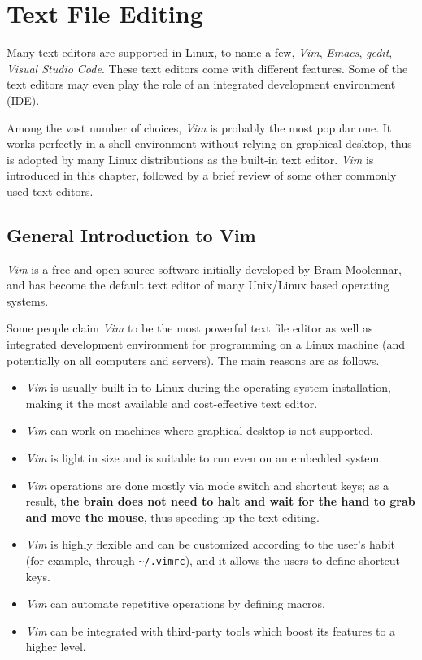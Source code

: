 \chapter{Text File Editing} \label{ch:tfe}

Many text editors are supported in Linux, to name a few, \textit{Vim}, \textit{Emacs}, \textit{gedit}, \textit{Visual Studio Code}. These text editors come with different features. Some of the text editors may even play the role of an integrated development environment (IDE).

Among the vast number of choices, \textit{Vim} is probably the most popular one. It works perfectly in a shell environment without relying on graphical desktop, thus is adopted by many Linux distributions as the built-in text editor. \textit{Vim} is introduced in this chapter, followed by a brief review of some other commonly used text editors.

\section{General Introduction to Vim}

\textit{Vim} is a free and open-source software initially developed by Bram Moolennar, and has become the default text editor of many Unix/Linux based operating systems.

Some people claim \textit{Vim} to be the most powerful text file editor as well as integrated development environment for programming on a Linux machine (and potentially on all computers and servers). The main reasons are as follows.
\begin{itemize}
  \item \textit{Vim} is usually built-in to Linux during the operating system installation, making it the most available and cost-effective text editor.
  \item \textit{Vim} can work on machines where graphical desktop is not supported.
  \item \textit{Vim} is light in size and is suitable to run even on an embedded system.
  \item \textit{Vim} operations are done mostly via mode switch and shortcut keys; as a result, \textbf{the brain does not need to halt and wait for the hand to grab and move the mouse}, thus speeding up the text editing.
  \item \textit{Vim} is highly flexible and can be customized according to the user's habit (for example, through \verb|~/.vimrc|), and it allows the users to define shortcut keys.
  \item \textit{Vim} can automate repetitive operations by defining macros.
  \item \textit{Vim} can be integrated with third-party tools which boost its features to a higher level.
\end{itemize}

